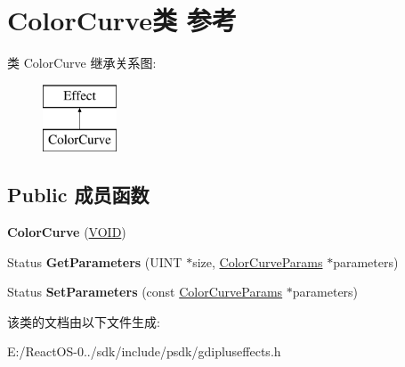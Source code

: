 \hypertarget{class_color_curve}{}\section{Color\+Curve类 参考}
\label{class_color_curve}
类 Color\+Curve 继承关系图\+:\begin{figure}[H]
\begin{center}
\leavevmode
\includegraphics[height=2.000000cm]{class_color_curve}
\end{center}
\end{figure}
\subsection*{Public 成员函数}
\begin{DoxyCompactItemize}
\item 
\mbox{\label{class_color_curve_ab59b98794820483409498f66c4726a12}} 
{\bfseries Color\+Curve} (\hyperlink{interfacevoid}{V\+O\+ID})
\item 
\mbox{\label{class_color_curve_a154641afe5510de32ce8b111f4b5e7dd}} 
Status {\bfseries Get\+Parameters} (U\+I\+NT $\ast$size, \hyperlink{struct_color_curve_params}{Color\+Curve\+Params} $\ast$parameters)
\item 
\mbox{\label{class_color_curve_a2611fe848ab8369045bf6eac565c5302}} 
Status {\bfseries Set\+Parameters} (const \hyperlink{struct_color_curve_params}{Color\+Curve\+Params} $\ast$parameters)
\end{DoxyCompactItemize}


该类的文档由以下文件生成\+:\begin{DoxyCompactItemize}
\item 
E\+:/\+React\+O\+S-\/0../sdk/include/psdk/gdipluseffects.\+h\end{DoxyCompactItemize}
